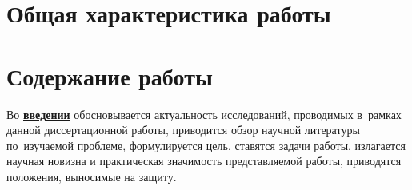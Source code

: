\section*{Общая характеристика работы}

\newcommand{\actuality}{\pdfbookmark[1]{Актуальность}{actuality}\underline{\textbf{\actualityTXT}}}
\newcommand{\progress}{\pdfbookmark[1]{Разработанность темы}{progress}\underline{\textbf{\progressTXT}}}
\newcommand{\aim}{\pdfbookmark[1]{Цели}{aim}\underline{{\textbf\aimTXT}}}
\newcommand{\tasks}{\pdfbookmark[1]{Задачи}{tasks}\underline{\textbf{\tasksTXT}}}
\newcommand{\aimtasks}{\pdfbookmark[1]{Цели и задачи}{aimtasks}\aimtasksTXT}
\newcommand{\novelty}{\pdfbookmark[1]{Научная новизна}{novelty}\underline{\textbf{\noveltyTXT}}}
\newcommand{\influence}{\pdfbookmark[1]{Практическая значимость}{influence}\underline{\textbf{\influenceTXT}}}
\newcommand{\methods}{\pdfbookmark[1]{Методология и методы исследования}{methods}\underline{\textbf{\methodsTXT}}}
\newcommand{\defpositions}{\pdfbookmark[1]{Положения, выносимые на защиту}{defpositions}\underline{\textbf{\defpositionsTXT}}}
\newcommand{\reliability}{\pdfbookmark[1]{Достоверность}{reliability}\underline{\textbf{\reliabilityTXT}}}
\newcommand{\probation}{\pdfbookmark[1]{Апробация}{probation}\underline{\textbf{\probationTXT}}}
\newcommand{\contribution}{\pdfbookmark[1]{Личный вклад}{contribution}\underline{\textbf{\contributionTXT}}}
\newcommand{\publications}{\pdfbookmark[1]{Публикации}{publications}\underline{\textbf{\publicationsTXT}}}




\section*{Содержание работы}
Во \underline{\textbf{введении}} обосновывается актуальность
исследований, проводимых в~рамках данной диссертационной работы,
приводится обзор научной литературы по~изучаемой проблеме,
формулируется цель, ставятся задачи работы, излагается научная новизна
и практическая значимость представляемой работы, приводятся положения, выносимые на защиту.

